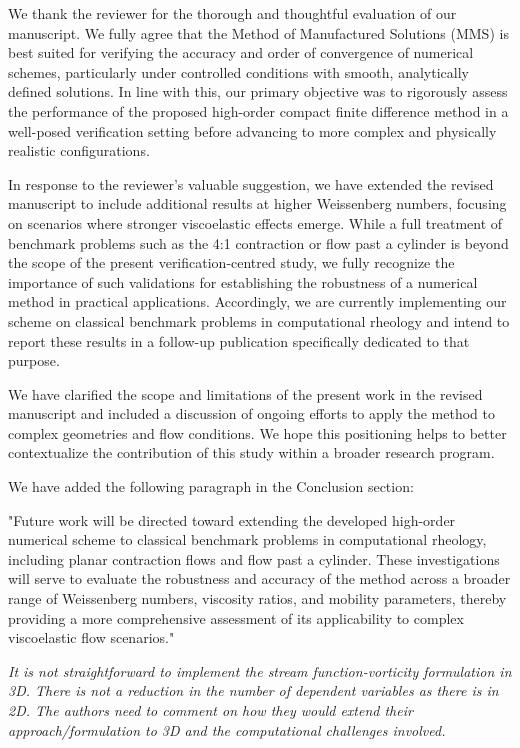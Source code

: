\documentclass[12pt]{article}
\begin{document}
We thank the reviewer for the thorough and thoughtful evaluation of our manuscript. We fully agree that the Method of Manufactured Solutions (MMS) is best suited for verifying the accuracy and order of convergence of numerical schemes, particularly under controlled conditions with smooth, analytically defined solutions. In line with this, our primary objective was to rigorously assess the performance of the proposed high-order compact finite difference method in a well-posed verification setting before advancing to more complex and physically realistic configurations.

In response to the reviewer’s valuable suggestion, we have extended the revised manuscript to include additional results at higher Weissenberg numbers, focusing on scenarios where stronger viscoelastic effects emerge. While a full treatment of benchmark problems such as the 4:1 contraction or flow past a cylinder is beyond the scope of the present verification-centred study, we fully recognize the importance of such validations for establishing the robustness of a numerical method in practical applications. Accordingly, we are currently implementing our scheme on classical benchmark problems in computational rheology and intend to report these results in a follow-up publication specifically dedicated to that purpose.

We have clarified the scope and limitations of the present work in the revised manuscript and included a discussion of ongoing efforts to apply the method to complex geometries and flow conditions. We hope this positioning helps to better contextualize the contribution of this study within a broader research program.

We have added the following paragraph in the Conclusion section:

"Future work will be directed toward extending the developed high-order numerical scheme to classical benchmark problems in computational rheology, including planar contraction flows and flow past a cylinder. These investigations will serve to evaluate the robustness and accuracy of the method across a broader range of Weissenberg numbers, viscosity ratios, and mobility parameters, thereby providing a more comprehensive assessment of its applicability to complex viscoelastic flow scenarios."


\vspace{3mm}
{\it It is not straightforward to implement the stream function-vorticity formulation in 3D. There is not a reduction in the number of dependent variables as there is in 2D. The authors need to comment on how they would extend their approach/formulation to 3D and the computational challenges involved.}
\vspace{3mm}
\end{document}

